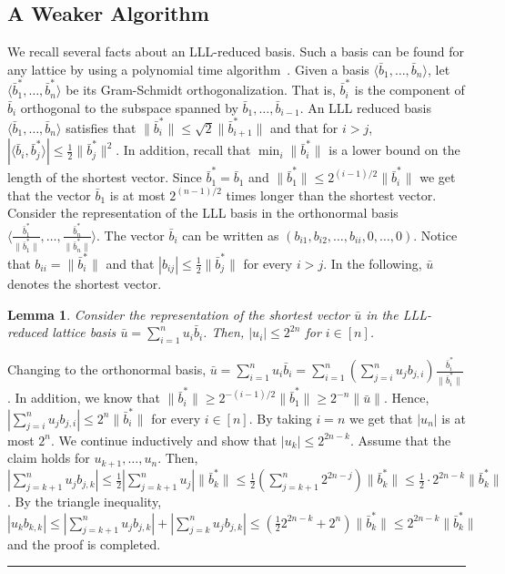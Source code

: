 \documentclass[11pt]{article}
\newtheorem{lemma}[theorem]{Lemma}
\newcommand{\qedsymb}{\hfill{\rule{2mm}{2mm}}}
\newenvironment{proof}{\begin{trivlist}
\item[\hspace{\labelsep}{\sl\noindent Proof:\/}]
}{\qedsymb\end{trivlist}}
\newcommand\alternate[2]{{#1}}
\newcommand\omittedproof[1]{\alternate{#1}{Omitted.}}
\begin{document}
\subsection{A Weaker Algorithm}\label{sec_first_alg}

We recall several facts about an LLL-reduced basis. Such a basis can be found for any lattice by using a polynomial
time algorithm~\cite{LLL}. Given a basis $\langle \bar{b}_1,\ldots,\bar{b}_n \rangle$, let $\langle
\bar{b}_1^*,\ldots,\bar{b}_n^* \rangle$ be its Gram-Schmidt orthogonalization. That is, $\bar{b}_i^*$ is the component
of $\bar{b}_i$ orthogonal to the subspace spanned by $\bar{b}_1,\ldots,\bar{b}_{i-1}$. An LLL reduced basis $\langle
\bar{b}_1,\ldots,\bar{b}_n \rangle$ satisfies that $\|\bar{b}_i^*\| \le \sqrt{2} \|\bar{b}_{i+1}^*\|$ and that for
$i>j$, $|\langle \bar{b}_i, \bar{b}_j^*\rangle| \le \frac{1}{2}\|\bar{b}_j^*\|^2 $. In addition, recall that $\min_i
\|\bar{b}_i^*\|$ is a lower bound on the length of the shortest vector. Since $\bar{b}_1^* = \bar{b}_1$ and
$\|\bar{b}_1^*\| \le 2^{(i-1)/2} \|\bar{b}_{i}^*\|$ we get that the vector $\bar{b}_1$ is at most $2^{(n-1)/2}$ times
longer than the shortest vector. Consider the representation of the LLL basis in the orthonormal basis $\langle
\frac{\bar{b}_1^*}{\|\bar{b}_1^*\|} , \ldots, \frac{\bar{b}_n^*}{\|\bar{b}_n^*\|} \rangle$. The vector $\bar{b}_i$ can
be written as $(b_{i1},b_{i2},\ldots,b_{ii},0,\ldots,0)$. Notice that $b_{ii}=\|\bar{b}_i^*\|$ and that $|b_{ij}| \le
\frac{1}{2} \|\bar{b}_j^*\|$ for every $i>j$. In the following, $\bar{u}$ denotes the shortest vector.

\begin{lemma}\label{svp_coordinates}
Consider the representation of the shortest vector $\bar{u}$ in the LLL-reduced lattice basis $\bar{u}=\sum_{i=1}^n u_i
\bar{b}_i$. Then, $|u_i| \le 2^{2n}$ for $i\in [n]$.
\end{lemma}
\begin{proof}\omittedproof{
Changing to the orthonormal basis, $\bar{u}=\sum_{i=1}^n u_i \bar{b}_i = \sum_{i=1}^n (\sum_{j=i}^{n} u_j
b_{j,i})\frac{\bar{b}_i^*}{\|\bar{b}_i^*\|}$. In addition, we know that $\|\bar{b}_i^*\| \ge 2^{-(i-1)/2}
\|\bar{b}_1^*\| \ge 2^{-n} \|\bar{u}\|$. Hence, $|\sum_{j=i}^{n} u_j b_{j,i}| \le 2^n \|\bar{b}_i^*\|$ for every $i\in
[n]$. By taking $i=n$ we get that $|u_n|$ is at most $2^n$. We continue inductively and show that $|u_k| \le 2^{2n-k}$.
Assume that the claim holds for $u_{k+1},\ldots,u_n$. Then, $|\sum_{j=k+1}^{n} u_j b_{j,k}| \le \frac{1}{2}
|\sum_{j=k+1}^n u_j| \|\bar{b}_k^*\| \le \frac{1}{2} (\sum_{j=k+1}^n 2^{2n-j}) \|\bar{b}_k^*\| \le \frac{1}{2} \cdot
2^{2n-k} \|\bar{b}_k^*\|$. By the triangle inequality, $|u_k b_{k,k}| \le |\sum_{j=k+1}^{n} u_j b_{j,k}| +
|\sum_{j=k}^{n} u_j b_{j,k}| \le (\frac{1}{2} 2^{2n-k} + 2^n) \|\bar{b}_k^*\| \le 2^{2n-k}\|\bar{b}_k^*\|$ and the
proof is completed.
}\end{proof}
\end{document}
